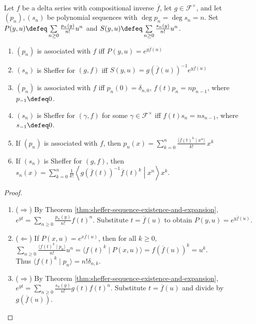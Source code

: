\begin{theorem} \label{thm:sheffer-generating-and-operator-characterizations} \\
Let $f$ be a delta series with compositional inverse $\overline f$, let $g\in\mathscr{F}^{\times}$, and let $(p_n),(s_n)$ be polynomial sequences with $\deg p_n=\deg s_n=n$. Set $P(y,u)\defeq\sum\limits_{n\geq0}\frac{p_n(y)}{n!}u^n$ and $S(y,u)\defeq\sum\limits_{n\geq0}\frac{s_n(y)}{n!}u^n$.
\begin{enumerate}[label=(\roman*)]
\setlength{\itemsep}{0pt}
\item $(p_n)$ is associated with $f$ iff $P(y,u)=e^{y\overline f(u)}$
\item $(s_n)$ is Sheffer for $(g,f)$ iff $S(y,u)=g(\overline f(u))^{-1}e^{y\overline f(u)}$
\item $(p_n)$ is associated with $f$ iff $p_n(0)=\delta_{n,0}$, $f(t)p_n=np_{n-1}$, where $p_{-1}\defeq0$.
\item $(s_n)$ is Sheffer for $(\gamma,f)$ for some $\gamma\in\mathscr{F}^{\times}$ iff $f(t)s_n=ns_{n-1}$, where $s_{-1}\defeq0$.
\item If $(p_n)$ is associated with $f$, then $p_n(x)=\sum\limits_{k=0}^{n} \frac{\langle \overline f(t)^k\mid x^n\rangle}{k!}\,x^k$
\item If $(s_n)$ is Sheffer for $(g,f)$, then $s_n(x)=\sum\limits_{k=0}^{n} \frac{1}{k!} \left\langle g(\overline f(t))^{-1}\overline f(t)^k\middle|x^n\right\rangle x^k$.
\end{enumerate}
\begin{proof}
\begin{enumerate}[label=(\roman*).]
\setlength{\itemsep}{0pt}
\item[$(i)$]($\Rightarrow$) By Theorem \ref{thm:sheffer-sequence-existence-and-expansion}, $e^{yt}=\sum\limits_{n\geq0}\frac{p_n(y)}{n!}f(t)^n$. Substitute $t=\overline f(u)$ to obtain $P(y,u)=e^{y\overline f(u)}$.
\item[$(i)$]($\Leftarrow$) If $P(x,u)=e^{x\overline f(u)}$, then for all $k\geq0$, $\sum\limits_{n\geq0}\frac{\langle f(t)^k\mid p_n\rangle}{n!}u^n =\langle f(t)^k\mid P(x,u)\rangle =f(\overline f(u))^k=u^k$.\\
Thus $\langle f(t)^k\mid p_n\rangle=n!\delta_{n,k}$.
\item[$(ii)$]($\Rightarrow$) By Theorem \ref{thm:sheffer-sequence-existence-and-expansion}, $e^{yt}=\sum\limits_{n\geq0}\frac{s_n(y)}{n!}g(t)f(t)^n$. Substitute $t=\overline f(u)$ and divide by $g(\overline f(u))$.

\end{enumerate}
\end{proof}
\end{theorem}

